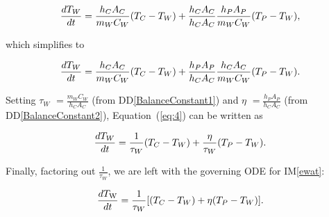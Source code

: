 \documentclass[12pt]{article}
\newcommand{\ddref}[1]{DD\ref{#1}}
\newcommand{\iref}[1]{IM\ref{#1}}
\begin{document}
\begin{equation*}
\\ \frac{dT_W}{dt} = \frac{h_C A_C}{m_W C_W} (T_C - T_W) + 
\frac{h_C A_C}{h_C A_C} \frac{h_P A_P}{m_WC_W} (T_P - T_W),
\end{equation*}

\noindent
which simplifies to

\begin{equation}
\\ \frac{dT_W}{dt} = \frac{h_C A_C}{m_W C_W} (T_C - T_W) + 
\frac{h_P A_P}{h_C A_C} \frac{h_C A_C}{m_WC_W} (T_P - T_W).\label{eq:4}
\end{equation}

\noindent
Setting $\tau_W$ $ = \frac{m_W C_W}{h_C A_C}$ (from \ddref{BalanceConstant1}) and $\eta$ 
  $ = \frac{h_P A_P}{h_C A_C}$ (from \ddref{BalanceConstant2}), Equation~(\ref{eq:4}) 
  can be written as

\begin{equation*}
\\ \frac{dT_W}{dt} = \frac{1}{\tau_W} (T_C - T_W) + 
\frac{\eta}{\tau_W}(T_P - T_W).
\end{equation*}

\noindent
Finally, factoring out $\frac{1}{\tau_W}$, we are left with the governing ODE for \iref{ewat}:

\begin{equation*}
\\ \frac{dT_{\mathrm{W}}}{dt} = \frac{1}{\tau_W} [(T_C - T_W) + 
{\eta}(T_P - T_W)].
\end{equation*}

~\newline

\end{document}
